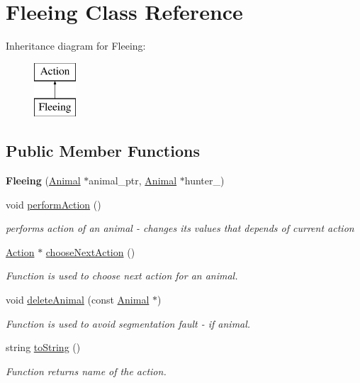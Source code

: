 \hypertarget{class_fleeing}{}\section{Fleeing Class Reference}
\label{class_fleeing}
Inheritance diagram for Fleeing\+:\begin{figure}[H]
\begin{center}
\leavevmode
\includegraphics[height=2.000000cm]{class_fleeing}
\end{center}
\end{figure}
\subsection*{Public Member Functions}
\begin{DoxyCompactItemize}
\item 
\hypertarget{class_fleeing_a0e1cbc5c9818c27f88543e2cfbd6c71c}{}{\bfseries Fleeing} (\hyperlink{class_animal}{Animal} $\ast$animal\+\_\+ptr, \hyperlink{class_animal}{Animal} $\ast$hunter\+\_\+)\label{class_fleeing_a0e1cbc5c9818c27f88543e2cfbd6c71c}

\item 
void \hyperlink{class_fleeing_afe47ee936d28b2508c9f833080453b64}{perform\+Action} ()
\begin{DoxyCompactList}\small\item\em performs action of an animal -\/ changes it\textquotesingle{}s values that depends of current action \end{DoxyCompactList}\item 
\hyperlink{class_action}{Action} $\ast$ \hyperlink{class_fleeing_a07c3b3096f885a5a4f11d9bdd7e57c6f}{choose\+Next\+Action} ()
\begin{DoxyCompactList}\small\item\em Function is used to choose next action for an animal. \end{DoxyCompactList}\item 
void \hyperlink{class_fleeing_a2d79eadf6416380fbe0183ca289f5686}{delete\+Animal} (const \hyperlink{class_animal}{Animal} $\ast$)
\begin{DoxyCompactList}\small\item\em Function is used to avoid segmentation fault -\/ if animal. \end{DoxyCompactList}\item 
string \hyperlink{class_fleeing_ab0ef11dd8f35cbca7c8157e3ae83f7f0}{to\+String} ()
\begin{DoxyCompactList}\small\item\em Function returns name of the action. \end{DoxyCompactList}\end{DoxyCompactItemize}
